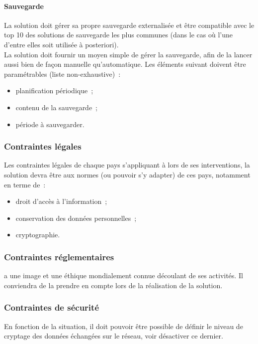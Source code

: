 \paragraph{Sauvegarde}
La solution doit gérer sa propre sauvegarde externalisée et être compatible avec le top 10 des solutions de sauvegarde les plus communes (dans le cas où l'une d'entre elles soit utilisée à posteriori).
\\
La solution doit fournir un moyen simple de gérer la sauvegarde, afin de la lancer aussi bien de façon manuelle qu'automatique. Les éléments suivant doivent être paramétrables (liste non-exhaustive)~:
\begin{itemize}
\item planification périodique~;
\item contenu de la sauvegarde~;
\item période à sauvegarder.
\end{itemize}

\subsubsection{Contraintes légales}
Les contraintes légales de chaque pays s'appliquant à \mo lors de ses interventions, la solution devra être aux normes (ou pouvoir s'y adapter) de ces pays, notamment en terme de~:
\begin{itemize}
\item droit d'accès à l'information~;
\item conservation des données personnelles~;
\item cryptographie.
\end{itemize}

\subsubsection{Contraintes réglementaires}
\mo a une image et une éthique mondialement connue découlant de ses activités. Il conviendra de la prendre en compte lors de la réalisation de la solution.

\subsubsection{Contraintes de sécurité}
En fonction de la situation, il doit pouvoir être possible de définir le niveau de cryptage des données échangées sur le réseau, voir désactiver ce dernier.

